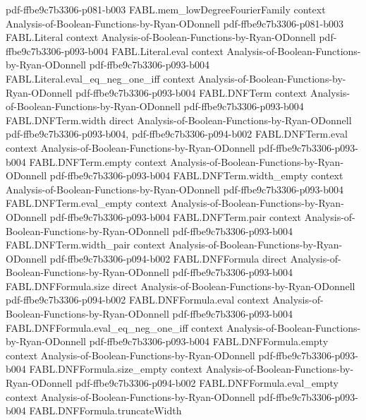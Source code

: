 \begin{theorem}
  {pdf-ffbe9c7b3306-p081-b003}
\proofstep
  {FABL.mem_lowDegreeFourierFamily}
  {context}
  {Analysis-of-Boolean-Functions-by-Ryan-ODonnell}
  {pdf-ffbe9c7b3306-p081-b003}
\proofstep
  {FABL.Literal}
  {context}
  {Analysis-of-Boolean-Functions-by-Ryan-ODonnell}
  {pdf-ffbe9c7b3306-p093-b004}
\proofstep
  {FABL.Literal.eval}
  {context}
  {Analysis-of-Boolean-Functions-by-Ryan-ODonnell}
  {pdf-ffbe9c7b3306-p093-b004}
\proofstep
  {FABL.Literal.eval_eq_neg_one_iff}
  {context}
  {Analysis-of-Boolean-Functions-by-Ryan-ODonnell}
  {pdf-ffbe9c7b3306-p093-b004}
\proofstep
  {FABL.DNFTerm}
  {context}
  {Analysis-of-Boolean-Functions-by-Ryan-ODonnell}
  {pdf-ffbe9c7b3306-p093-b004}
\proofstep
  {FABL.DNFTerm.width}
  {direct}
  {Analysis-of-Boolean-Functions-by-Ryan-ODonnell}
  {pdf-ffbe9c7b3306-p093-b004,
    pdf-ffbe9c7b3306-p094-b002}
\proofstep
  {FABL.DNFTerm.eval}
  {context}
  {Analysis-of-Boolean-Functions-by-Ryan-ODonnell}
  {pdf-ffbe9c7b3306-p093-b004}
\proofstep
  {FABL.DNFTerm.empty}
  {context}
  {Analysis-of-Boolean-Functions-by-Ryan-ODonnell}
  {pdf-ffbe9c7b3306-p093-b004}
\proofstep
  {FABL.DNFTerm.width_empty}
  {context}
  {Analysis-of-Boolean-Functions-by-Ryan-ODonnell}
  {pdf-ffbe9c7b3306-p093-b004}
\proofstep
  {FABL.DNFTerm.eval_empty}
  {context}
  {Analysis-of-Boolean-Functions-by-Ryan-ODonnell}
  {pdf-ffbe9c7b3306-p093-b004}
\proofstep
  {FABL.DNFTerm.pair}
  {context}
  {Analysis-of-Boolean-Functions-by-Ryan-ODonnell}
  {pdf-ffbe9c7b3306-p093-b004}
\proofstep
  {FABL.DNFTerm.width_pair}
  {context}
  {Analysis-of-Boolean-Functions-by-Ryan-ODonnell}
  {pdf-ffbe9c7b3306-p094-b002}
\proofstep
  {FABL.DNFFormula}
  {direct}
  {Analysis-of-Boolean-Functions-by-Ryan-ODonnell}
  {pdf-ffbe9c7b3306-p093-b004}
\proofstep
  {FABL.DNFFormula.size}
  {direct}
  {Analysis-of-Boolean-Functions-by-Ryan-ODonnell}
  {pdf-ffbe9c7b3306-p094-b002}
\proofstep
  {FABL.DNFFormula.eval}
  {context}
  {Analysis-of-Boolean-Functions-by-Ryan-ODonnell}
  {pdf-ffbe9c7b3306-p093-b004}
\proofstep
  {FABL.DNFFormula.eval_eq_neg_one_iff}
  {context}
  {Analysis-of-Boolean-Functions-by-Ryan-ODonnell}
  {pdf-ffbe9c7b3306-p093-b004}
\proofstep
  {FABL.DNFFormula.empty}
  {context}
  {Analysis-of-Boolean-Functions-by-Ryan-ODonnell}
  {pdf-ffbe9c7b3306-p093-b004}
\proofstep
  {FABL.DNFFormula.size_empty}
  {context}
  {Analysis-of-Boolean-Functions-by-Ryan-ODonnell}
  {pdf-ffbe9c7b3306-p094-b002}
\proofstep
  {FABL.DNFFormula.eval_empty}
  {context}
  {Analysis-of-Boolean-Functions-by-Ryan-ODonnell}
  {pdf-ffbe9c7b3306-p093-b004}
\proofstep
  {FABL.DNFFormula.truncateWidth}

\end{theorem}
